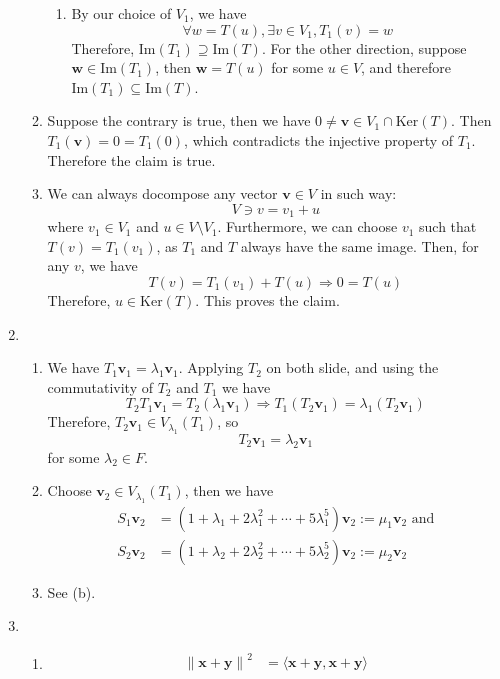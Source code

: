 \documentclass[12pt]{article}
\newcommand{\kerne}{\mathrm{Ker}}
\newcommand{\ima}{\mathrm{Im}}
\newcommand\norm[1]{\left\lVert#1\right\rVert}
\theoremstyle{definition}
\begin{document}
\begin{enumerate}
\begin{enumerate}
\begin{enumerate}
      \item By our choice of $V_1$, we have
      \[
\forall w = T(u), \exists v\in V_1, T_1(v) = w
      \]
      Therefore, $\ima(T_1) \supseteq \ima(T)$.
      For the other direction, suppose $\mathbf{w}\in \ima(T_1)$, then $\mathbf{w} = T(u)$ for some $u\in V$, and therefore $ \ima(T_1)\subseteq \ima(T)$.
    \end{enumerate}
    \item Suppose the contrary is true, then we have $0\neq \mathbf{v}\in V_1\cap \kerne(T)$.
    Then $T_1(\mathbf{v}) = 0 = T_1(0)$, which contradicts the injective property of $T_1$. Therefore the claim is true.
    \item We can always docompose any vector $\mathbf{v}\in V$ in such way:
    \[
V\ni v = v_1+u
    \]
    where $v_1\in V_1$ and $u\in V\setminus V_1$. Furthermore, we can choose $v_1$ such that $T(v) = T_1(v_1)$, as $T_1$ and $T$ always have the same image. 
    Then, for any $v$, we have
    \[
T(v) = T_1(v_1)+T(u) \Rightarrow 0 = T(u)
    \]
    Therefore, $u\in \kerne(T)$. This proves the claim.
  \end{enumerate}
  \item %
  \begin{enumerate}
    \item We have $T_1\mathbf{v}_1 = \lambda_1\mathbf{v}_1$. Applying $T_2$ on both slide, and using the commutativity of $T_2$ and $T_1$ we have
    \[
T_2T_1\mathbf{v}_1 = T_2(\lambda_1\mathbf{v}_1)\Rightarrow T_1(T_2\mathbf{v}_1) = \lambda_1(T_2\mathbf{v}_1)
    \]
    Therefore, $T_2\mathbf{v}_1\in V_{\lambda_1}(T_1)$, so
    \[
    T_2\mathbf{v}_1 = \lambda_2\mathbf{v}_1
    \]
    for some $\lambda_2\in F$.
    \item Choose $\mathbf{v}_2\in V_{\lambda_1}(T_1)$, then we have
    \begin{align*}
S_1\mathbf{v}_2 &= (1+\lambda_1+2\lambda_1^2+\cdots +5\lambda_1^5)\mathbf{v}_2:=\mu_1\mathbf{v}_2 \text{ and}\\
S_2\mathbf{v}_2 &= (1+\lambda_2+2\lambda_2^2+\cdots +5\lambda_2^5)\mathbf{v}_2:=\mu_2\mathbf{v}_2
    \end{align*}
    \item See (b).
  \end{enumerate}
  \item %
  \begin{enumerate}
    \item 
    \begin{align*}
    \norm{\mathbf{x}+\mathbf{y}}^2 &= \langle \mathbf{x}+\mathbf{y},\mathbf{x}+\mathbf{y}\rangle\\

\end{align*}
\end{enumerate}
\end{enumerate}
\end{document}
